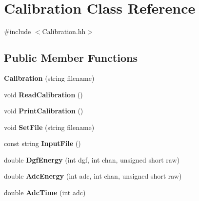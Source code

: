 \hypertarget{class_calibration}{\section{Calibration Class Reference}
\label{class_calibration}
}


{\ttfamily \#include $<$Calibration.\-hh$>$}

\subsection*{Public Member Functions}
\begin{DoxyCompactItemize}
\item 
\hypertarget{class_calibration_a8ac7c98e774549cbf0db954983c118cc}{{\bfseries Calibration} (string filename)}\label{class_calibration_a8ac7c98e774549cbf0db954983c118cc}

\item 
\hypertarget{class_calibration_ad675a1c74ecd23e3af37fcffdeeed246}{void {\bfseries Read\-Calibration} ()}\label{class_calibration_ad675a1c74ecd23e3af37fcffdeeed246}

\item 
\hypertarget{class_calibration_af224d188d64080db8d14eb0ddbb909f7}{void {\bfseries Print\-Calibration} ()}\label{class_calibration_af224d188d64080db8d14eb0ddbb909f7}

\item 
\hypertarget{class_calibration_a8fe1671f5fa525d684b75f381b680f50}{void {\bfseries Set\-File} (string filename)}\label{class_calibration_a8fe1671f5fa525d684b75f381b680f50}

\item 
\hypertarget{class_calibration_a10affa676c2fb505d3075d23c3bf0157}{const string {\bfseries Input\-File} ()}\label{class_calibration_a10affa676c2fb505d3075d23c3bf0157}

\item 
\hypertarget{class_calibration_a0ea90a9b417ec5e50312b4bba2875f70}{double {\bfseries Dgf\-Energy} (int dgf, int chan, unsigned short raw)}\label{class_calibration_a0ea90a9b417ec5e50312b4bba2875f70}

\item 
\hypertarget{class_calibration_a07ba44fdc31250e347939588759d2796}{double {\bfseries Adc\-Energy} (int adc, int chan, unsigned short raw)}\label{class_calibration_a07ba44fdc31250e347939588759d2796}

\item 
\hypertarget{class_calibration_a860b3c2c4a2350009bbbf337aa56a212}{double {\bfseries Adc\-Time} (int adc)}\label{class_calibration_a860b3c2c4a2350009bbbf337aa56a212}


\end{DoxyCompactItemize}
